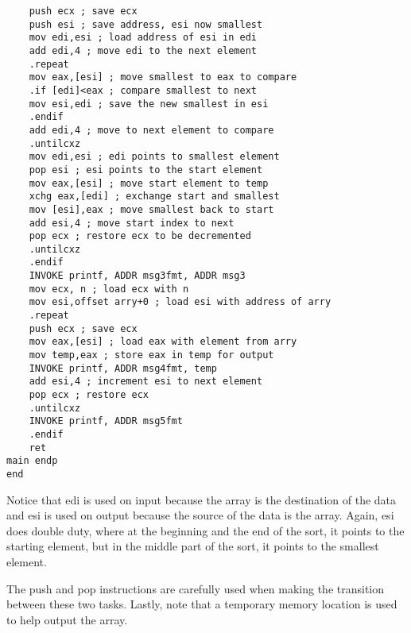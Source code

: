 \documentclass[10pt]{article}
\begin{document}
\begin{verbatim}
    push ecx ; save ecx
    push esi ; save address, esi now smallest
    mov edi,esi ; load address of esi in edi
    add edi,4 ; move edi to the next element
    .repeat
    mov eax,[esi] ; move smallest to eax to compare
    .if [edi]<eax ; compare smallest to next
    mov esi,edi ; save the new smallest in esi
    .endif
    add edi,4 ; move to next element to compare
    .untilcxz
    mov edi,esi ; edi points to smallest element
    pop esi ; esi points to the start element
    mov eax,[esi] ; move start element to temp
    xchg eax,[edi] ; exchange start and smallest
    mov [esi],eax ; move smallest back to start
    add esi,4 ; move start index to next
    pop ecx ; restore ecx to be decremented
    .untilcxz
    .endif
    INVOKE printf, ADDR msg3fmt, ADDR msg3
    mov ecx, n ; load ecx with n
    mov esi,offset arry+0 ; load esi with address of arry
    .repeat
    push ecx ; save ecx
    mov eax,[esi] ; load eax with element from arry
    mov temp,eax ; store eax in temp for output
    INVOKE printf, ADDR msg4fmt, temp
    add esi,4 ; increment esi to next element
    pop ecx ; restore ecx
    .untilcxz
    INVOKE printf, ADDR msg5fmt
    .endif
    ret
main endp
end
\end{verbatim}

Notice that edi is used on input because the array is the destination of the data and esi is used on output because the source of the data is the array. Again, esi does double duty, where at the beginning and the end of the sort, it points to the starting element, but in the middle part of the sort, it points to the smallest element.

The push and pop instructions are carefully used when making the transition between these two tasks. Lastly, note that a temporary memory location is used to help output the array.
\end{document}

